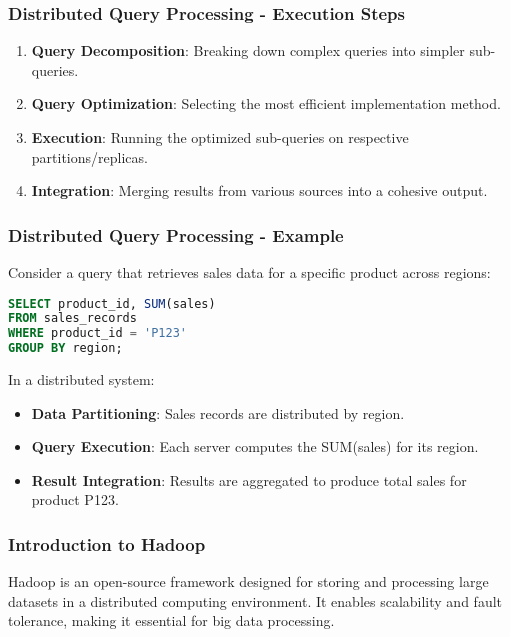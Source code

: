 \documentclass[aspectratio=169]{beamer}
\begin{document}
\begin{frame}[fragile]
    \frametitle{Distributed Query Processing - Execution Steps}
    \begin{enumerate}
        \item \textbf{Query Decomposition}: Breaking down complex queries into simpler sub-queries.
        \item \textbf{Query Optimization}: Selecting the most efficient implementation method.
        \item \textbf{Execution}: Running the optimized sub-queries on respective partitions/replicas.
        \item \textbf{Integration}: Merging results from various sources into a cohesive output.
    \end{enumerate}
\end{frame}

\begin{frame}[fragile]
    \frametitle{Distributed Query Processing - Example}
    Consider a query that retrieves sales data for a specific product across regions:
    \begin{lstlisting}[language=SQL]
SELECT product_id, SUM(sales)
FROM sales_records
WHERE product_id = 'P123'
GROUP BY region;
    \end{lstlisting}
    
    In a distributed system:
    \begin{itemize}
        \item \textbf{Data Partitioning}: Sales records are distributed by region.
        \item \textbf{Query Execution}: Each server computes the SUM(sales) for its region.
        \item \textbf{Result Integration}: Results are aggregated to produce total sales for product P123.
    \end{itemize}
\end{frame}

\begin{frame}[fragile]
    \frametitle{Introduction to Hadoop}
    Hadoop is an open-source framework designed for storing and processing large datasets in a distributed computing environment.
    It enables scalability and fault tolerance, making it essential for big data processing.
\end{frame}
\end{document}
